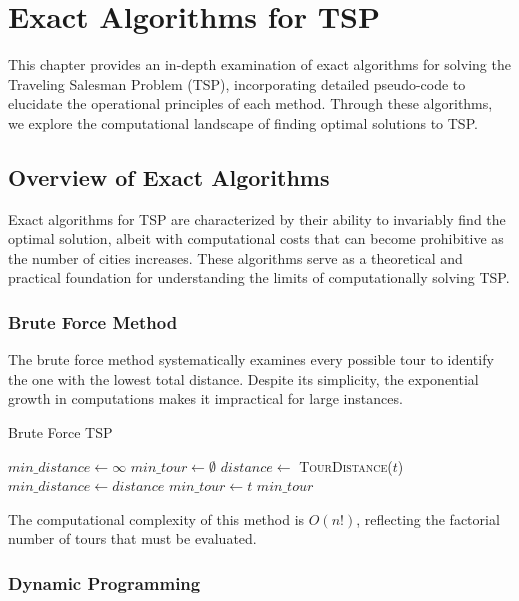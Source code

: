 \chapter{Exact Algorithms for TSP} \label{chapt:3}

This chapter provides an in-depth examination of exact algorithms for solving the Traveling Salesman Problem (TSP), incorporating detailed pseudo-code to elucidate the operational principles of each method. Through these algorithms, we explore the computational landscape of finding optimal solutions to TSP.

\section{Overview of Exact Algorithms}

Exact algorithms for TSP are characterized by their ability to invariably find the optimal solution, albeit with computational costs that can become prohibitive as the number of cities increases. These algorithms serve as a theoretical and practical foundation for understanding the limits of computationally solving TSP.

\subsection{Brute Force Method}

The brute force method systematically examines every possible tour to identify the one with the lowest total distance. Despite its simplicity, the exponential growth in computations makes it impractical for large instances.

\begin{algorithm}
	\caption{Brute Force TSP}\label{bruteforce}
	\begin{algorithmic}[1]
		\State $min\_distance \gets \infty$
		\State $min\_tour \gets \emptyset$
		\State $distance \gets$ \textsc{TourDistance}($t$)
		\State $min\_distance \gets distance$
		\State $min\_tour \gets t$
		\EndIf
		\EndFor
		\State \Return $min\_tour$
		\EndProcedure
	\end{algorithmic}
\end{algorithm}

The computational complexity of this method is $O(n!)$, reflecting the factorial number of tours that must be evaluated.

\subsection{Dynamic Programming}

